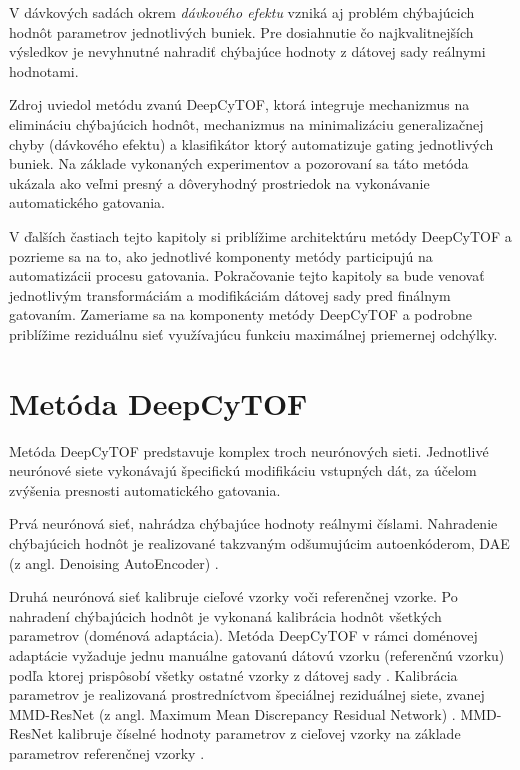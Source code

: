 V dávkových sadách okrem \textit{dávkového efektu} vzniká aj problém chýbajúcich hodnôt parametrov jednotlivých buniek. Pre dosiahnutie čo najkvalitnejších výsledkov je nevyhnutné nahradiť chýbajúce hodnoty z dátovej sady reálnymi hodnotami. 

Zdroj \cite{Li2017} uviedol metódu zvanú DeepCyTOF, ktorá integruje mechanizmus na elimináciu chýbajúcich hodnôt, mechanizmus na minimalizáciu generalizačnej chyby (dávkového efektu) a klasifikátor ktorý automatizuje gating jednotlivých buniek. Na základe vykonaných experimentov a pozorovaní sa táto metóda ukázala ako veľmi presný a dôveryhodný prostriedok na vykonávanie automatického gatovania.

V ďalších častiach tejto kapitoly si priblížime architektúru metódy DeepCyTOF a pozrieme sa na to, ako jednotlivé komponenty metódy participujú na automatizácii procesu gatovania. Pokračovanie tejto kapitoly sa bude venovať jednotlivým transformáciám a modifikáciám dátovej sady pred finálnym gatovaním. Zameriame sa na komponenty metódy DeepCyTOF a podrobne priblížime reziduálnu sieť využívajúcu funkciu maximálnej priemernej odchýlky.

\section{Metóda DeepCyTOF}
\label{metoda_deepcytof}

Metóda DeepCyTOF predstavuje komplex troch neurónových sieti. Jednotlivé neurónové siete vykonávajú špecifickú modifikáciu vstupných dát, za účelom zvýšenia presnosti automatického gatovania. 

Prvá neurónová sieť, nahrádza chýbajúce hodnoty reálnymi číslami. Nahradenie chýbajúcich hodnôt je realizované takzvaným odšumujúcim autoenkóderom, DAE (z angl. Denoising AutoEncoder) \cite{Li2017}. 

Druhá neurónová sieť kalibruje cieľové vzorky voči referenčnej vzorke. Po nahradení chýbajúcich hodnôt je vykonaná kalibrácia hodnôt všetkých parametrov (doménová adaptácia). Metóda DeepCyTOF v rámci doménovej adaptácie vyžaduje jednu manuálne gatovanú dátovú vzorku (referenčnú vzorku) podľa ktorej prispôsobí všetky ostatné vzorky z dátovej sady \cite{Li2017}. Kalibrácia parametrov je realizovaná prostredníctvom špeciálnej reziduálnej siete, zvanej MMD-ResNet (z angl. Maximum Mean Discrepancy Residual Network) \cite{Li2016, Li2017}. MMD-ResNet kalibruje číselné hodnoty parametrov z cieľovej vzorky na základe parametrov referenčnej vzorky \cite{Li2016}.

